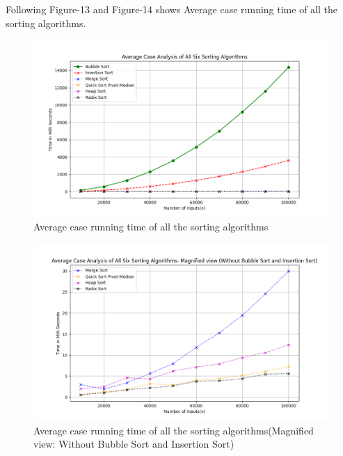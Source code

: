 \documentclass[a4paper,12pt]{report}
\begin{document}
Following Figure-13 and Figure-14 shows Average case running time of all the sorting algorithms. 
\begin{figure}[H]
	\centering
	\includegraphics[width=1.1\textwidth]{./Averageofall.png}
	\caption{Average case running time of all the sorting algorithms}
	\label{fig:Average of all}
\end{figure}

\begin{figure}[H]
	\centering
	\includegraphics[width=1.1\textwidth]{./Averageofallmagnified.png}
	\caption{Average case running time of all the sorting algorithms(Magnified view: Without Bubble Sort and Insertion Sort)}
	\label{fig:Average of all Magnified}
\end{figure}
\end{document}
